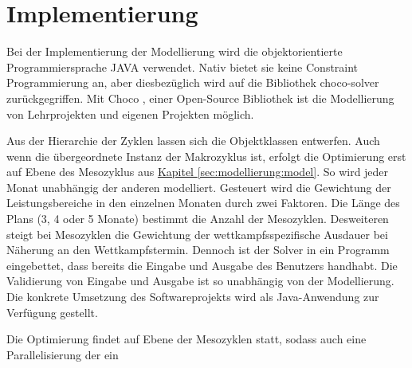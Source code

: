 \chapter{Implementierung}
\label{sec:implementierung} 
Bei der Implementierung der Modellierung wird die objektorientierte Programmiersprache JAVA \cite{java} verwendet. Nativ bietet sie keine Constraint Programmierung an, aber diesbezüglich wird auf die Bibliothek choco-solver \cite{ChocoSolverWeb} zurückgegriffen. Mit Choco \cite{ChocoSolverWeb}, einer Open-Source Bibliothek ist die Modellierung von Lehrprojekten und eigenen Projekten möglich. \par
Aus der Hierarchie der Zyklen lassen sich die Objektklassen entwerfen. Auch wenn die übergeordnete Instanz der Makrozyklus ist, erfolgt die Optimierung erst auf Ebene des Mesozyklus aus  \hyperref[sec:modellierung:model]{Kapitel \ref{sec:modellierung:model}}. So wird jeder Monat unabhängig der anderen modelliert. Gesteuert wird die Gewichtung der Leistungsbereiche in den einzelnen Monaten durch zwei Faktoren. Die Länge des Plans (3, 4 oder 5 Monate) bestimmt die Anzahl der Mesozyklen. Desweiteren steigt bei Mesozyklen die Gewichtung der wettkampfsspezifische Ausdauer bei Näherung an den Wettkampfstermin.
Dennoch ist der Solver in ein Programm eingebettet, dass bereits die Eingabe und Ausgabe des Benutzers handhabt. Die Validierung von Eingabe und Ausgabe ist so unabhängig von der Modellierung. 
Die konkrete Umsetzung des Softwareprojekts wird als Java-Anwendung zur Verfügung gestellt. 

Die Optimierung findet auf Ebene der Mesozyklen statt, sodass auch eine Parallelisierung der ein
